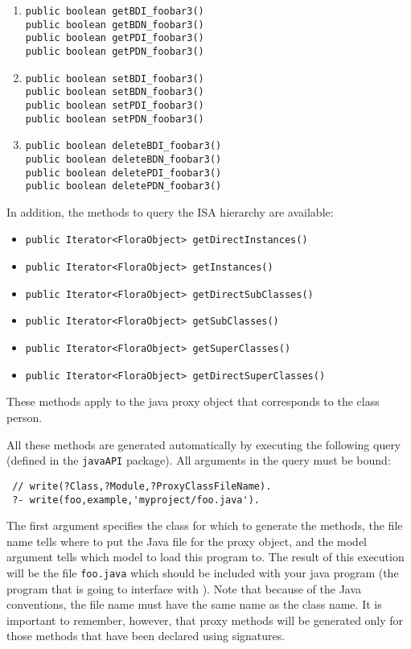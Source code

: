 \begin{enumerate}
\item  {\tt public boolean getBDI\_foobar3()}   \\
  {\tt public boolean getBDN\_foobar3()} \\
  {\tt public boolean getPDI\_foobar3()}   \\
  {\tt public boolean getPDN\_foobar3()}
\item {\tt public boolean setBDI\_foobar3()}   \\
  {\tt public boolean setBDN\_foobar3()} \\
  {\tt public boolean setPDI\_foobar3()}   \\
  {\tt public boolean setPDN\_foobar3()}
\item {\tt public boolean deleteBDI\_foobar3()}  \\
  {\tt public boolean deleteBDN\_foobar3()}  \\
  {\tt public boolean deletePDI\_foobar3()}  \\
  {\tt public boolean deletePDN\_foobar3()}  
\end{enumerate}

In addition, the methods to query the ISA hierarchy are available:
\begin{itemize}
\item  {\tt public Iterator<FloraObject> getDirectInstances()}
\item  {\tt public Iterator<FloraObject> getInstances()}
\item  {\tt public Iterator<FloraObject> getDirectSubClasses()}
\item  {\tt public Iterator<FloraObject> getSubClasses()}
\item   {\tt public Iterator<FloraObject> getSuperClasses()}   
\item   {\tt public Iterator<FloraObject> getDirectSuperClasses()}   
\end{itemize}
These methods apply to the java proxy object that corresponds to the \fl
class person.

All these methods are generated automatically by executing the following
\FLSYSTEM query (defined in the \texttt{javaAPI} package).
All arguments in the query must be bound:
\begin{verbatim}
 // write(?Class,?Module,?ProxyClassFileName).
 ?- write(foo,example,'myproject/foo.java').
\end{verbatim}
The first argument specifies the class for which to generate the methods,
the file name tells where to put the Java file for the proxy object,
and the model argument tells which \FLSYSTEM model to load this program to. The
result of this execution will be the file {\tt foo.java} which should be
included with your java program (the program that is going to interface with
\FLSYSTEM). Note that because of the Java conventions, the file name must have
the same name as the class name.
It is important to remember, however, that proxy methods will
be generated only for those \fl methods that have been declared using
signatures.

